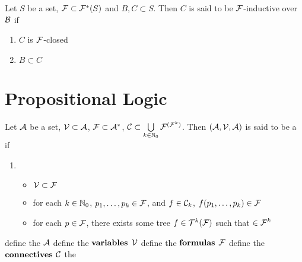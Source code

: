 \documentclass{book}
\begin{document}
	\begin{defn}
		Let $S$ be a set, $\mathcal{F} \subset \mathcal{F}^*(S)$ and $B, C \subset S$. Then $C$ is said to be $\mathcal{F}$-inductive over $\mathcal{B}$ if 
		\begin{enumerate}
			\item $C$ is $\mathcal{F}$-closed
			\item $B \subset C$
		\end{enumerate}
	\end{defn}
	
	
	\chapter{Propositional Logic}
	\begin{defn} 
		Let $\mathcal{A}$ be a set, $\mathcal{V} \subset \mathcal{A}$, $\mathcal{F} \subset \mathcal{A}^*$, $\mathcal{C} \subset \bigcup\limits_{k \in \mathbb{N}_0} \mathcal{F}^{(\mathcal{F}^k)}$. Then $(\mathcal{A}, \mathcal{V}, \mathcal{A})$ is said to be a  
		if 
		\begin{enumerate}
			\item 
			\begin{itemize}
				\item $\mathcal{V} \subset \mathcal{F}$
				\item for each $k \in \mathbb{N}_0$, $p_1, \ldots, p_k \in \mathcal{F}$, and $f \in \mathcal{C}_k$, $f(p_1, \ldots, p_k) \in \mathcal{F}$
				\item for each $p \in \mathcal{F}$, there exists some tree $f \in \mathcal{T}^k(\mathcal{F})$ such that $ \in \mathcal{F}^{k}$ 
			\end{itemize}
		\end{enumerate}
		define the  $\mathcal{A}$
		define the $\textbf{variables}$ $\mathcal{V}$
		define the $\textbf{formulas}$ $\mathcal{F}$
		define the $\textbf{connectives}$ $\mathcal{C}$
		the 
	\end{defn}

	\begin{ex}
		
	\end{ex}
	
	
	
	
	
	
\end{document}
